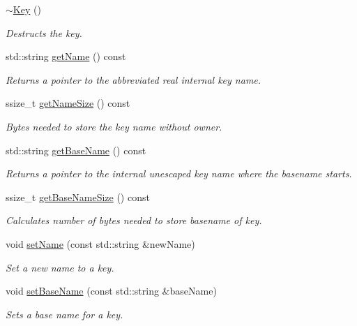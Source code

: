 \begin{DoxyCompactItemize}
\mbox{\hyperlink{classkdb_1_1Key_a35dd6ae58d125a298e30aed13b15c1f4}{$\sim$\+Key}} ()
\begin{DoxyCompactList}\small\item\em Destructs the key. \end{DoxyCompactList}\item 
std\+::string \mbox{\hyperlink{classkdb_1_1Key_a6c1812730e9cb714893c9f9b1e503303}{get\+Name}} () const
\begin{DoxyCompactList}\small\item\em Returns a pointer to the abbreviated real internal {\ttfamily key} name. \end{DoxyCompactList}\item 
ssize\+\_\+t \mbox{\hyperlink{classkdb_1_1Key_a976627183cdc6835a969475e99ec8bc1}{get\+Name\+Size}} () const
\begin{DoxyCompactList}\small\item\em Bytes needed to store the key name without owner. \end{DoxyCompactList}\item 
std\+::string \mbox{\hyperlink{classkdb_1_1Key_ab998c6e1b121b956653f01df5762aed8}{get\+Base\+Name}} () const
\begin{DoxyCompactList}\small\item\em Returns a pointer to the internal unescaped key name where the {\ttfamily basename} starts. \end{DoxyCompactList}\item 
ssize\+\_\+t \mbox{\hyperlink{classkdb_1_1Key_aef3cc0ef1621b91718604e899b43ebc0}{get\+Base\+Name\+Size}} () const
\begin{DoxyCompactList}\small\item\em Calculates number of bytes needed to store basename of {\ttfamily key}. \end{DoxyCompactList}\item 
void \mbox{\hyperlink{classkdb_1_1Key_aac3b5d3a854d02187484bfbdbdf975af}{set\+Name}} (const std\+::string \&new\+Name)
\begin{DoxyCompactList}\small\item\em Set a new name to a key. \end{DoxyCompactList}\item 
void \mbox{\hyperlink{classkdb_1_1Key_a0c8c7cef03d6482d89973be72fb3c8b8}{set\+Base\+Name}} (const std\+::string \&base\+Name)
\begin{DoxyCompactList}\small\item\em Sets a base name for a key. \end{DoxyCompactList}\item 

\end{DoxyCompactItemize}
